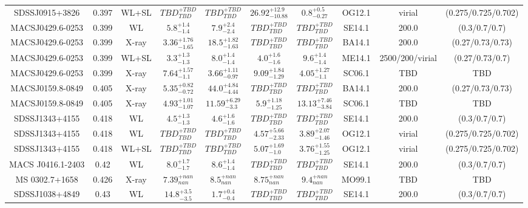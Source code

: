 \begin{table}
\begin{tabular}{cccccccccc}
SDSSJ0915+3826 & 0.397 & WL+SL & ${TBD}^{+TBD}_{TBD}$ & ${TBD}^{+TBD}_{TBD}$ & ${26.92}^{+12.9}_{-10.88}$ & ${0.8}^{+0.5}_{-0.27}$ & OG12.1 & virial & (0.275/0.725/0.702) \\
MACSJ0429.6-0253 & 0.399 & WL & ${5.8}^{+1.4}_{-1.4}$ & ${7.9}^{+2.4}_{-2.4}$ & ${TBD}^{+TBD}_{TBD}$ & ${TBD}^{+TBD}_{TBD}$ & SE14.1 & 200.0 & (0.3/0.7/0.7) \\
MACSJ0429.6-0253 & 0.399 & X-ray & ${3.36}^{+1.76}_{-1.65}$ & ${18.5}^{+1.82}_{-1.63}$ & ${TBD}^{+TBD}_{TBD}$ & ${TBD}^{+TBD}_{TBD}$ & BA14.1 & 200.0 & (0.27/0.73/0.73) \\
MACSJ0429.6-0253 & 0.399 & WL+SL & ${3.3}^{+1.3}_{-1.3}$ & ${8.0}^{+1.4}_{-1.4}$ & ${4.0}^{+1.6}_{-1.6}$ & ${9.6}^{+1.4}_{-1.4}$ & ME14.1 & 2500/200/virial & (0.27/0.73/0.7) \\
MACSJ0429.6-0253 & 0.399 & X-ray & ${7.64}^{+1.57}_{-1.1}$ & ${3.66}^{+1.11}_{-0.97}$ & ${9.09}^{+1.84}_{-1.29}$ & ${4.05}^{+1.27}_{-1.1}$ & SC06.1 & TBD & TBD \\
MACSJ0159.8-0849 & 0.405 & X-ray & ${5.35}^{+0.82}_{-0.72}$ & ${44.0}^{+4.84}_{-4.44}$ & ${TBD}^{+TBD}_{TBD}$ & ${TBD}^{+TBD}_{TBD}$ & BA14.1 & 200.0 & (0.27/0.73/0.73) \\
MACSJ0159.8-0849 & 0.405 & X-ray & ${4.93}^{+1.01}_{-1.07}$ & ${11.59}^{+6.29}_{-3.3}$ & ${5.9}^{+1.18}_{-1.25}$ & ${13.13}^{+7.46}_{-3.84}$ & SC06.1 & TBD & TBD \\
SDSSJ1343+4155 & 0.418 & WL & ${4.5}^{+1.3}_{-1.3}$ & ${4.6}^{+1.6}_{-1.6}$ & ${TBD}^{+TBD}_{TBD}$ & ${TBD}^{+TBD}_{TBD}$ & SE14.1 & 200.0 & (0.3/0.7/0.7) \\
SDSSJ1343+4155 & 0.418 & WL & ${TBD}^{+TBD}_{TBD}$ & ${TBD}^{+TBD}_{TBD}$ & ${4.57}^{+5.66}_{-2.33}$ & ${3.89}^{+2.07}_{-1.46}$ & OG12.1 & virial & (0.275/0.725/0.702) \\
SDSSJ1343+4155 & 0.418 & WL+SL & ${TBD}^{+TBD}_{TBD}$ & ${TBD}^{+TBD}_{TBD}$ & ${5.07}^{+1.69}_{-1.0}$ & ${3.76}^{+1.55}_{-1.25}$ & OG12.1 & virial & (0.275/0.725/0.702) \\
MACS J0416.1-2403 & 0.42 & WL & ${8.0}^{+1.7}_{-1.7}$ & ${8.6}^{+1.4}_{-1.4}$ & ${TBD}^{+TBD}_{TBD}$ & ${TBD}^{+TBD}_{TBD}$ & SE14.1 & 200.0 & (0.3/0.7/0.7) \\
MS 0302.7+1658 & 0.426 & X-ray & ${7.39}^{+nan}_{nan}$ & ${8.5}^{+nan}_{nan}$ & ${8.75}^{+nan}_{nan}$ & ${9.4}^{+nan}_{nan}$ & MO99.1 & TBD & TBD \\
SDSSJ1038+4849 & 0.43 & WL & ${14.8}^{+3.5}_{-3.5}$ & ${1.7}^{+0.4}_{-0.4}$ & ${TBD}^{+TBD}_{TBD}$ & ${TBD}^{+TBD}_{TBD}$ & SE14.1 & 200.0 & (0.3/0.7/0.7) \\

\end{tabular}
\end{table}

